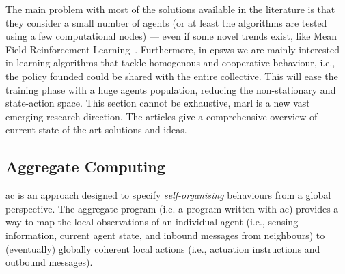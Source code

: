 \documentclass[11pt]{article}
\begin{document}
The main problem with most of the solutions available in the literature is that they consider a small number of agents (or at least the algorithms are tested using a few computational nodes) --- even if some novel trends exist, like Mean Field Reinforcement Learning~\cite{DBLP:journals/corr/abs-2108-02731}.
%
Furthermore, in \acp{cpsw} we are mainly interested in learning algorithms that tackle homogenous and cooperative behaviour, i.e., the policy founded could be shared with the entire collective. 
%
This will ease the training phase with a huge agents population, reducing the non-stationary and state-action space.
%
This section cannot be exhaustive, \ac{marl} is a new vast emerging research direction. 
%
The articles \cite{DBLP:journals/aamas/Hernandez-LealK19, DBLP:journals/corr/abs-1911-10635, DBLP:journals/corr/abs-1908-03963} give a comprehensive overview of current state-of-the-art solutions and ideas.
\subsection{Aggregate Computing}

\ac{ac} is an approach designed to specify \emph{self-organising} behaviours from a global perspective.
%
The aggregate program (i.e. a program written with \ac{ac}) provides a way to map the local observations of an individual agent (i.e., sensing information, current agent state, and inbound messages from neighbours) to (eventually) globally coherent local actions
 (i.e., actuation instructions and outbound messages).
%
\end{document}
